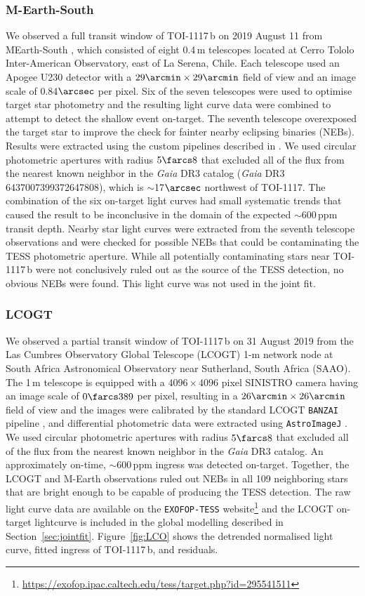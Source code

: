 \documentclass[fleqn,usenatbib,useAMS]{mnras}
\begin{document}
\subsubsection{M-Earth-South}
We observed a full transit window of TOI-1117\,b on 2019 August 11 from MEarth-South \citep{Irwin:2007}, which consisted of eight 0.4\,m telescopes located at Cerro Tololo Inter-American Observatory, east of La Serena, Chile. Each telescope used an Apogee U230 detector with a $29\arcmin\times29\arcmin$ field of view and an image scale of 0.84$\arcsec$ per pixel. Six of the seven telescopes were used to optimise target star photometry and the resulting light curve data were combined to attempt to detect the shallow event on-target. The seventh telescope overexposed the target star to improve the check for fainter nearby eclipsing binaries (NEBs). Results were extracted using the custom pipelines described in \cite{Irwin:2007}. We used circular photometric apertures with radius $5\farcs8$ that excluded all of the flux from the nearest known neighbor in the \textit{Gaia} DR3 catalog (\textit{Gaia} DR3 6437007399372647808), which is $\sim$17$\arcsec$ northwest of TOI-1117. The combination of the six on-target light curves had small systematic trends that caused the result to be inconclusive in the domain of the expected $\sim$600\,ppm transit depth.  Nearby star light curves were extracted from the seventh telescope observations and were checked for possible NEBs that could be contaminating the TESS photometric aperture. While all potentially contaminating stars near TOI-1117\,b were not conclusively ruled out as the source of the TESS detection, no obvious NEBs were found. This light curve was not used in the joint fit.

\subsubsection{LCOGT}
We observed a partial transit window of TOI-1117\,b on 31 August 2019 from the Las Cumbres Observatory Global Telescope (LCOGT) \citep{Brown:2013} 1-m network node at South Africa Astronomical Observatory near Sutherland, South Africa (SAAO). The 1\,m telescope is equipped with a $4096\times4096$ pixel SINISTRO camera having an image scale of $0\farcs389$ per pixel, resulting in a $26\arcmin\times26\arcmin$ field of view and the images were calibrated by the standard LCOGT {\tt BANZAI} pipeline \citep{McCully:2018}, and differential photometric data were extracted using {\tt AstroImageJ} \citep{Collins:2017}. We used circular photometric apertures with radius $5\farcs8$ that excluded all of the flux from the nearest known neighbor in the \textit{Gaia} DR3 catalog. An approximately on-time, $\sim$600\,ppm ingress was detected on-target. Together, the LCOGT and M-Earth observations ruled out NEBs in all 109 neighboring stars that are bright enough to be capable of producing the TESS detection. The raw light curve data are available on the {\tt EXOFOP-TESS} website\footnote{\url{https://exofop.ipac.caltech.edu/tess/target.php?id=295541511}} and the LCOGT on-target lightcurve is included in the global modelling described in Section~\ref{sec:jointfit}. Figure~\ref{fig:LCO} shows the detrended normalised light curve, fitted ingress of TOI-1117\,b, and residuals. 
\end{document}
